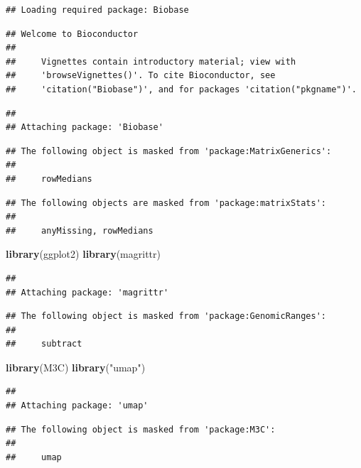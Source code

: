 \documentclass[
]{article}
\newenvironment{Shaded}{\begin{snugshade}}{\end{snugshade}}
\newcommand{\FunctionTok}[1]{\textcolor[rgb]{0.13,0.29,0.53}{\textbf{#1}}}
\newcommand{\NormalTok}[1]{#1}
\newcommand{\StringTok}[1]{\textcolor[rgb]{0.31,0.60,0.02}{#1}}
\begin{document}
\begin{verbatim}
## Loading required package: Biobase
\end{verbatim}

\begin{verbatim}
## Welcome to Bioconductor
## 
##     Vignettes contain introductory material; view with
##     'browseVignettes()'. To cite Bioconductor, see
##     'citation("Biobase")', and for packages 'citation("pkgname")'.
\end{verbatim}

\begin{verbatim}
## 
## Attaching package: 'Biobase'
\end{verbatim}

\begin{verbatim}
## The following object is masked from 'package:MatrixGenerics':
## 
##     rowMedians
\end{verbatim}

\begin{verbatim}
## The following objects are masked from 'package:matrixStats':
## 
##     anyMissing, rowMedians
\end{verbatim}

\begin{Shaded}
\begin{Highlighting}[]
\FunctionTok{library}\NormalTok{(ggplot2)}
\FunctionTok{library}\NormalTok{(magrittr)}
\end{Highlighting}
\end{Shaded}

\begin{verbatim}
## 
## Attaching package: 'magrittr'
\end{verbatim}

\begin{verbatim}
## The following object is masked from 'package:GenomicRanges':
## 
##     subtract
\end{verbatim}

\begin{Shaded}
\begin{Highlighting}[]
\FunctionTok{library}\NormalTok{(M3C)}
\FunctionTok{library}\NormalTok{(}\StringTok{"umap"}\NormalTok{)}
\end{Highlighting}
\end{Shaded}

\begin{verbatim}
## 
## Attaching package: 'umap'
\end{verbatim}

\begin{verbatim}
## The following object is masked from 'package:M3C':
## 
##     umap
\end{verbatim}
\end{document}
